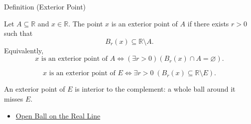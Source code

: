 \begin{definitionbox}{Definition (Exterior Point)}
\begin{definition}
\label{def:exterior-point}
Let $A\subseteq\mathbb{R}$ and $x\in\mathbb{R}$.  The point $x$ is an
exterior point of $A$ if there exists $r>0$ such that
\[
  B_r(x)\subseteq\mathbb{R}\setminus A.
\]
Equivalently,
\[
  x\text{ is an exterior point of }A
  \Longleftrightarrow
  (\exists r>0)(B_r(x)\cap A=\varnothing).
\]
\end{definition}
\end{definitionbox}
\begin{remark*}
\[
x \text{ is an exterior point of } E \Longleftrightarrow \exists r>0\;(B_{r}(x)\subseteq \mathbb{R}\setminus E).
\]
\end{remark*}
\begin{remark*}[Interpretation]
An exterior point of $E$ is interior to the complement: a whole ball around it misses $E$.
\end{remark*}
\begin{dependencies}
\begin{itemize}
  \item \hyperref[def:open-ball]{Open Ball on the Real Line}
\end{itemize}
\end{dependencies}
